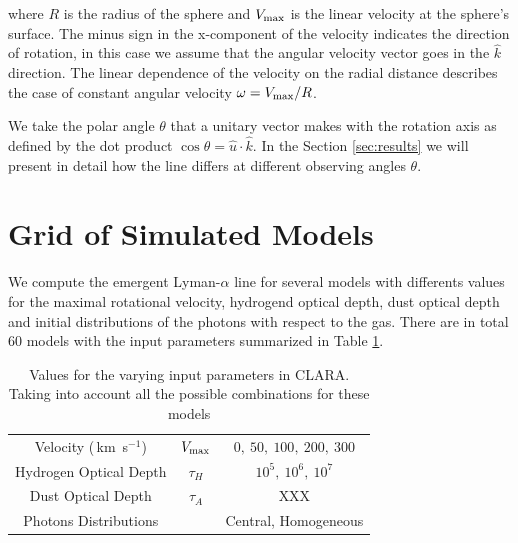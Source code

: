 \documentclass[usenatbib]{mn2e}
\newcommand{\kms}{\,km~s$^{-1}$}
\begin{document}
where $R$ is the radius of the sphere and $V_{\rm max}$ is the linear
velocity at the sphere's surface. The minus sign in the x-component of
the velocity indicates the direction of rotation, in this case we
assume that the angular velocity vector goes in the $\hat{k}$
direction.  The linear dependence of the velocity on the radial
distance describes the case of constant angular velocity
$\omega=V_{\rm max}/R$.  

We take the polar angle $\theta$ that a unitary vector makes with the
rotation axis as defined by the dot product $\cos\theta =
{\hat{u}\cdot\hat{k}}$. In the Section \ref{sec:results} we will
present in detail how the line differs at different observing angles
$\theta$. 



\section{Grid of Simulated Models}
\label{sec:models}

We compute the emergent Lyman-$\alpha$ line for several models with
differents values for the maximal rotational velocity, hydrogend optical
depth, dust optical depth and initial distributions of the photons
with respect to the gas. There are in total 60 models with the input
parameters summarized in Table  \ref{table:models}. 

\begin{table}
\begin{center}
\begin{tabular}{ccc}\hline
Velocity (\kms) & $V_{\rm max}$&$0,\ 50,\ 100,\ 200,\ 300$\\
Hydrogen Optical Depth & $\tau_{H} $ & $10^{5},\ 10^{6},\ 10^{7}$\\
Dust Optical Depth & $\tau_{A}$ & XXX \\
Photons Distributions & & Central, Homogeneous\\
\hline
\end{tabular}
\caption{
Values for the varying input parameters in CLARA. Taking into account
all the possible combinations for these models
} 
\label{table:models}
\end{center}
\end{table}




\end{document}
